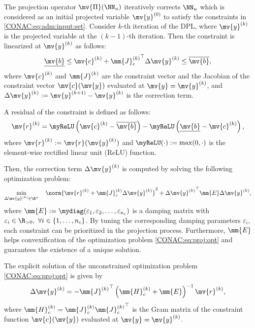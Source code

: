 The projection operator $\mv{\Pi}(\NN_u)$ iteratively corrects $\NN_u$ which is considered as an initial projected variable $\mv{y}^{(0)}$ to satisfy the constraints in \eqref{CONAC:eq:adm:input:set}.
Consider $k$-th iteration of the DPL, where $\mv{y}^{(k)}$ is the projected variable at the $(k-1)$-th iteration.
Then the constraint is linearized at $\mv{y}^{(k)}$ as follows:
\begin{equation}
  \underline{\mv{b}}
  \le
  \mv{c}^{(k)}
  + 
  {\mm{J}_c^{(k)}}^\top\Delta{\mv{y}}^{(k)}
  \le
  \overline{\mv{b}}
  ,
\end{equation}
where $\mv{c}^{(k)}$ and $\mm{J}^{(k)}$ are the constraint vector and the Jacobian of the constraint vector $\mv{c}(\mv{y})$ evaluated at $\mv{y}=\mv{y}^{(k)}$, and $\Delta\mv{y}^{(k)}:=\mv{y}^{(k+1)}-\mv{y}^{(k)}$ is the correction term.

A residual of the constraint is defined as follows:
\begin{equation}
  \label{CONAC:eq:proj:residual}
  \mv{r}^{(k)}
  = 
  \myReLU
  \left(
    \mv{c}^{(k)} - \overline{\mv{b}}
  \right)
  -
  \myReLU
  \left(
    \underline{\mv{b}} - \mv{c}^{(k)}
  \right)
  ,
\end{equation}
where $\mv{r}^{(k)}:=\mv{r}(\mv{y}^{(k)})$ and $\myReLU(\cdot):=\max(0, \cdot)$ is the element-wise rectified linear unit (ReLU) function.

Then, the correction term $\Delta\mv{y}^{(k)}$ is computed by solving the following optimization problem:
\begin{equation}
  \label{CONAC:eq:proj:opt}
  \min_{\Delta\mv{y}^{(k)}\in\R^n} \quad
  \norm{\mv{r}^{(k)} + \mm{J}_c^{(k)}\Delta\mv{y}^{(k)}}^2 
  + 
  {\Delta\mv{y}^{(k)}}^\top
  \mm{E}
  \Delta\mv{y}^{(k)}
  ,
\end{equation}
where $\mm{E}:=\mydiag(\varepsilon_1,\varepsilon_2,\ldots,\varepsilon_{n_c})$ is a damping matrix with $\varepsilon_i\in\R_{>0},\ \forall i\in\{1,\ldots,n_c\}$.
By tuning the corresponding damping parameters $\varepsilon_i$, each constraint can be prioritized in the projection process.
Furthermore, $\mm{E}$ helps convexification of the optimization problem \eqref{CONAC:eq:proj:opt} and guarantees the existence of a unique solution.

The explicit solution of the unconstrained optimization problem \eqref{CONAC:eq:proj:opt} is given by
\begin{equation}
  \label{CONAC:eq:proj:step}
  \Delta\mv{y}^{(k)}
  =
  -
  {\mm{J}^{(k)}}^{\top}
  \left(
    \mm{H}_c^{(k)}
    +\mm{E}
  \right)^{-1}
  \mv{r}^{(k)}
  ,
\end{equation}
where $\mm{H}_c^{(k)} = \mm{J}_c^{(k)}{\mm{J}_c^{(k)}}^{\top}$ is the Gram matrix of the constraint function $\mv{c}(\mv{y})$ evaluated at $\mv{y}=\mv{y}^{(k)}$.

